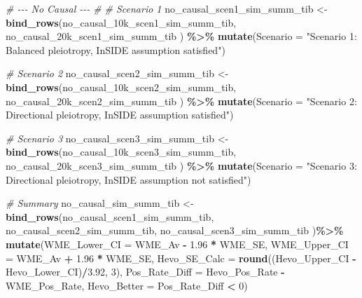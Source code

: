 \documentclass[
]{article}
\newenvironment{Shaded}{\begin{snugshade}}{\end{snugshade}}
\newcommand{\AttributeTok}[1]{\textcolor[rgb]{0.13,0.29,0.53}{#1}}
\newcommand{\CommentTok}[1]{\textcolor[rgb]{0.56,0.35,0.01}{\textit{#1}}}
\newcommand{\DecValTok}[1]{\textcolor[rgb]{0.00,0.00,0.81}{#1}}
\newcommand{\FloatTok}[1]{\textcolor[rgb]{0.00,0.00,0.81}{#1}}
\newcommand{\FunctionTok}[1]{\textcolor[rgb]{0.13,0.29,0.53}{\textbf{#1}}}
\newcommand{\NormalTok}[1]{#1}
\newcommand{\OtherTok}[1]{\textcolor[rgb]{0.56,0.35,0.01}{#1}}
\newcommand{\SpecialCharTok}[1]{\textcolor[rgb]{0.81,0.36,0.00}{\textbf{#1}}}
\newcommand{\StringTok}[1]{\textcolor[rgb]{0.31,0.60,0.02}{#1}}
\begin{document}
\begin{Shaded}
\begin{Highlighting}[]
\CommentTok{\# {-}{-}{-} No Causal {-}{-}{-} \#}
\CommentTok{\# Scenario 1}
\NormalTok{no\_causal\_scen1\_sim\_summ\_tib }\OtherTok{\textless{}{-}} \FunctionTok{bind\_rows}\NormalTok{(no\_causal\_10k\_scen1\_sim\_summ\_tib,}
\NormalTok{                                          no\_causal\_20k\_scen1\_sim\_summ\_tib}
\NormalTok{) }\SpecialCharTok{\%\textgreater{}\%}
  \FunctionTok{mutate}\NormalTok{(}\AttributeTok{Scenario =} \StringTok{"Scenario 1: Balanced pleiotropy, InSIDE assumption satisfied"}\NormalTok{)}

\CommentTok{\# Scenario 2}
\NormalTok{no\_causal\_scen2\_sim\_summ\_tib }\OtherTok{\textless{}{-}} \FunctionTok{bind\_rows}\NormalTok{(no\_causal\_10k\_scen2\_sim\_summ\_tib,}
\NormalTok{no\_causal\_20k\_scen2\_sim\_summ\_tib}
\NormalTok{                                          ) }\SpecialCharTok{\%\textgreater{}\%}
  \FunctionTok{mutate}\NormalTok{(}\AttributeTok{Scenario =} \StringTok{"Scenario 2: Directional pleiotropy, InSIDE assumption satisfied"}\NormalTok{)}

\CommentTok{\# Scenario 3}
\NormalTok{no\_causal\_scen3\_sim\_summ\_tib }\OtherTok{\textless{}{-}} \FunctionTok{bind\_rows}\NormalTok{(no\_causal\_10k\_scen3\_sim\_summ\_tib,}
\NormalTok{                                          no\_causal\_20k\_scen3\_sim\_summ\_tib}
\NormalTok{) }\SpecialCharTok{\%\textgreater{}\%}
  \FunctionTok{mutate}\NormalTok{(}\AttributeTok{Scenario =} \StringTok{"Scenario 3: Directional pleiotropy, InSIDE assumption not satisfied"}\NormalTok{)}


\CommentTok{\# Summary}
\NormalTok{no\_causal\_sim\_summ\_tib }\OtherTok{\textless{}{-}} \FunctionTok{bind\_rows}\NormalTok{(no\_causal\_scen1\_sim\_summ\_tib,}
\NormalTok{                                    no\_causal\_scen2\_sim\_summ\_tib,}
\NormalTok{                                    no\_causal\_scen3\_sim\_summ\_tib}
\NormalTok{)}\SpecialCharTok{\%\textgreater{}\%} 
  \FunctionTok{mutate}\NormalTok{(}\AttributeTok{WME\_Lower\_CI =}\NormalTok{ WME\_Av }\SpecialCharTok{{-}} \FloatTok{1.96} \SpecialCharTok{*}\NormalTok{ WME\_SE,}
         \AttributeTok{WME\_Upper\_CI =}\NormalTok{ WME\_Av }\SpecialCharTok{+} \FloatTok{1.96} \SpecialCharTok{*}\NormalTok{ WME\_SE,}
         \AttributeTok{Hevo\_SE\_Calc =} \FunctionTok{round}\NormalTok{((Hevo\_Upper\_CI }\SpecialCharTok{{-}}\NormalTok{ Hevo\_Lower\_CI)}\SpecialCharTok{/}\FloatTok{3.92}\NormalTok{, }\DecValTok{3}\NormalTok{),}
         \AttributeTok{Pos\_Rate\_Diff =}\NormalTok{ Hevo\_Pos\_Rate }\SpecialCharTok{{-}}\NormalTok{ WME\_Pos\_Rate,}
         \AttributeTok{Hevo\_Better =}\NormalTok{ Pos\_Rate\_Diff }\SpecialCharTok{\textless{}} \DecValTok{0}\NormalTok{)}



\end{Highlighting}
\end{Shaded}
\end{document}
